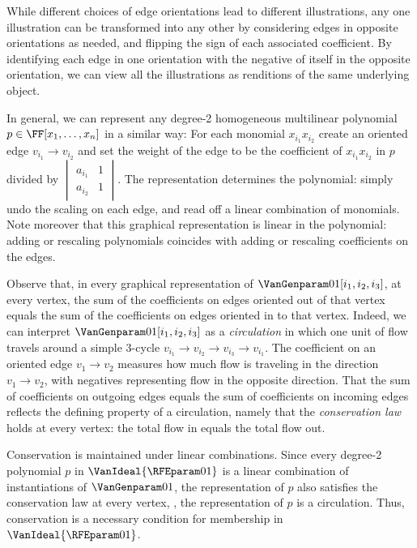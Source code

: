 \documentclass{toc}
\begin{document}
While different choices of edge orientations lead to different illustrations,
any one illustration can be transformed into any other by
considering edges in opposite orientations as needed,
and flipping the sign of each associated coefficient.
By identifying each edge in one orientation with the negative of itself in the
opposite orientation,
we can view all the illustrations as renditions of the same underlying object.

In general, we can represent any degree-2 homogeneous multilinear
polynomial \(p\in\FF[x_1,\ldots,x_n]\) in a similar way:
For each monomial $x_{i_1}x_{i_2}$ create an oriented edge $v_{i_1}\to v_{i_2}$ and set the weight of the edge
to be the coefficient of \(x_{i_1}x_{i_2}\) in \(p\) divided by
\(\begin{vmatrix}a_{i_1} & 1\\ a_{i_2} & 1\end{vmatrix}\).
The representation determines the polynomial:
simply undo the scaling on each edge,
and read off a linear combination of monomials.
Note moreover that this graphical representation is linear in the polynomial:
adding or rescaling polynomials coincides with adding or rescaling
coefficients on the edges.

Observe that,
in every graphical representation of \(\VanGenparam01[i_1, i_2, i_3]\),
at every vertex, the sum of the coefficients on edges oriented out of
that vertex equals the sum of the coefficients on edges oriented in to
that vertex.
Indeed, we can interpret \(\VanGenparam01[i_1, i_2, i_3]\) as a
\emph{circulation} in which one unit of flow travels around a simple
3-cycle \(v_{i_1} \to v_{i_2}\to v_{i_3}\to v_{i_1}\).
The coefficient on an oriented edge \(v_1\to v_2\) measures how much
flow is traveling in the direction \(v_1\to v_2\),
with negatives representing flow in the opposite direction.
That the sum of coefficients on outgoing edges equals the sum of coefficients on incoming edges reflects the defining property of a circulation, namely that the
\emph{conservation law} holds at every vertex:
the total flow in equals the total flow out.

Conservation is maintained under linear combinations. 
Since every degree-2 polynomial $p$ in \(\VanIdeal{\RFEparam01}\) is a
linear combination of instantiations of \(\VanGenparam01\), the representation of $p$ also satisfies the conservation law at every vertex, \ie, the representation of $p$ is a circulation. 
Thus, conservation is a necessary condition for membership in
\(\VanIdeal{\RFEparam01}\).
\end{document}
